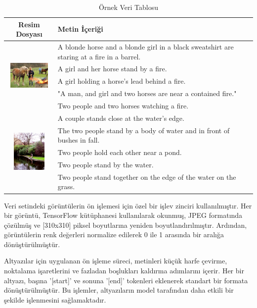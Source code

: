 \documentclass{article}
\begin{document}
\begin{table}[ht]
\centering
\caption{Örnek Veri Tablosu}
\vspace{10pt}
\begin{tabular}{|c|p{10cm}|}
\hline
\textbf{Resim Dosyası} & \textbf{Metin İçeriği} \\
\hline
\multirow{5}{*}{\includegraphics[width=2cm,height=2cm]{10815824_2997e03d76.jpg}} & A blonde horse and a blonde girl in a black sweatshirt are staring at a fire in a barrel. \\
& A girl and her horse stand by a fire. \\
& A girl holding a horse's lead behind a fire. \\
& "A man, and girl and two horses are near a contained fire." \\
& Two people and two horses watching a fire. \\
\hline
\multirow{5}{*}{\includegraphics[width=2cm,height=2cm]{3637013_c675de7705.jpg}} & A couple stands close at the water's edge. \\
& The two people stand by a body of water and in front of bushes in fall. \\
& Two people hold each other near a pond. \\
& Two people stand by the water. \\
& Two people stand together on the edge of the water on the grass. \\
\hline
\end{tabular}
\label{tablo:veri-seti-ornek}
\end{table}

Veri setindeki görüntülerin ön işlemesi için özel bir işlev zinciri kullanılmıştır. Her bir görüntü, TensorFlow kütüphanesi kullanılarak okunmuş, JPEG formatında çözülmüş ve [310x310] piksel boyutlarına yeniden boyutlandırılmıştır. Ardından, görüntülerin renk değerleri normalize edilerek 0 ile 1 arasında bir aralığa dönüştürülmüştür.

Altyazılar için uygulanan ön işleme süreci, metinleri küçük harfe çevirme, noktalama işaretlerini ve fazladan boşlukları kaldırma adımlarını içerir. Her bir altyazı, başına '[start]' ve sonuna '[end]' tokenleri eklenerek standart bir formata dönüştürülmüştür. Bu işlemler, altyazıların model tarafından daha etkili bir şekilde işlenmesini sağlamaktadır.
\end{document}
